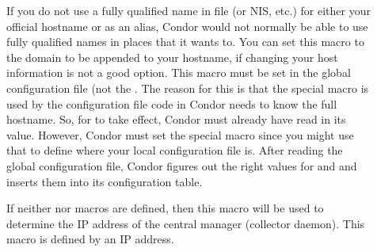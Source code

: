 \begin{description}
\item[] \label{param:DefaultDomainName}
  If you do not use a fully qualified name in file 
  (or NIS, etc.) for either your official hostname or as an
  alias, Condor would not normally be able to use fully qualified names
  in places that it wants to.  You can set this macro to the
  domain to be appended to your hostname, if changing your host
  information is not a good option.  This macro must be set in the
  global configuration file (not the .
  The reason for this is that the special 
  macro is used by the configuration file code in Condor needs
  to know the full hostname.  So, for  to
  take effect, Condor must already have read in its value.  However,
  Condor must set the  special macro since you
  might use that to define where your local configuration file is.  After
  reading the global configuration file, Condor figures out the right values
  for  and  and inserts them
  into its configuration table.

\item[] \label{param:CMIPAddr}
  If neither  nor 
   macros are defined, then this
  macro will be used to determine the IP address of the central
  manager (collector daemon).
  This macro is defined by an IP address.


\end{description}
